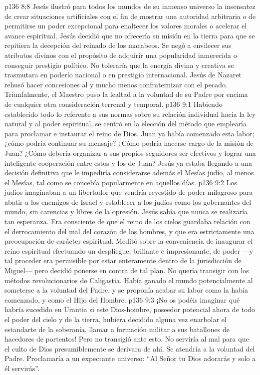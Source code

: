 \vs p136 8:8 \pc Jesús ilustró para todos los mundos de su inmenso universo la insensatez de crear situaciones artificiales con el fin de mostrar una autoridad arbitraria o de permitirse un poder excepcional para enaltecer los valores morales o acelerar el avance espiritual. Jesús decidió que no ofrecería su misión en la tierra para que se repitiera la decepción del reinado de los macabeos. Se negó a envilecer sus atributos divinos con el propósito de adquirir una popularidad inmerecida o conseguir prestigio político. No toleraría que la energía divina y creativa se trasmutara en poderío nacional o en prestigio internacional. Jesús de Nazaret rehusó hacer concesiones al  y mucho menos confraternizar con el pecado. Triunfalmente, el Maestro puso la lealtad a la voluntad de su Padre por encima de cualquier otra consideración terrenal y temporal.
\vs p136 9:1 Habiendo establecido todo lo referente a sus normas sobre su relación individual hacia la ley natural y al poder espiritual, se centró en la elección del método que emplearía para proclamar e instaurar el reino de Dios. Juan ya había comenzado esta labor; ¿cómo podría continuar su mensaje? ¿Cómo podría hacerse cargo de la misión de Juan? ¿Cómo debería organizar a sus propios seguidores ser efectivos y lograr una inteligente cooperación entre estos y los de Juan? Jesús ya estaba llegando a una decisión definitiva que le impediría considerarse además el Mesías judío, al menos el Mesías, tal como se concebía popularmente en aquellos días.
\vs p136 9:2 Los judíos imaginaban a un libertador que vendría revestido de poder milagroso para abatir a los enemigos de Israel y establecer a los judíos como los gobernantes del mundo, sin carencias y libres de la opresión. Jesús sabía que nunca se realizaría tan esperanza. Era consciente de que el reino de los cielos guardaba relación con el derrocamiento del mal del corazón de los hombres, y que era estrictamente una preocupación de carácter espiritual. Meditó sobre la conveniencia de inaugurar el reino espiritual efectuando un despliegue, brillante e impresionante, de poder ---y tal proceder era permisible por estar enteramente dentro de la jurisdicción de Miguel--- pero decidió ponerse en contra de tal plan. No quería transigir con los métodos revolucionarios de Caligastia. Había ganado el mundo potencialmente al someterse a la voluntad del Padre, y se proponía acabar su labor como la había comenzado, y como el Hijo del Hombre.
\vs p136 9:3 ¡No os podéis imaginar qué habría sucedido en Urantia si este Dios\hyp{}hombre, poseedor potencial ahora de todo el poder del cielo y de la tierra, hubiera decidido alguna vez enarbolar el estandarte de la soberanía, llamar a formación militar a sus batallones de hacedores de portentos! Pero no transigió ante esto. No serviría al mal para que el culto de Dios presumiblemente se derivara de ahí. Se atendría a la voluntad del Padre. Proclamaría a un expectante universo: “Al Señor tu Dios adorarás y solo a él servirás”.

